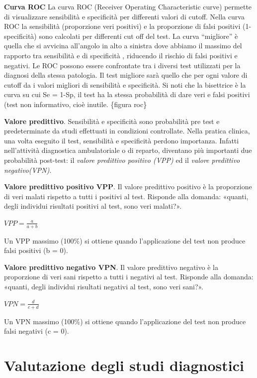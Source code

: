 \documentclass[]{book}
\begin{document}
\textbf{Curva ROC}
La curva ROC (Receiver Operating Characteristic curve) permette di visualizzare sensibilità e specificità per differenti valori di cutoff. Nella curva ROC la sensibilità (proporzione veri positivi) e la proporzione di falsi positivi (1- specificità) sono calcolati per differenti cut off del test. La curva ``migliore'' è quella che si avvicina all'angolo in alto a sinistra dove abbiamo il massimo del rapporto tra sensibilità e di specificità , riducendo il rischio di falsi positivi e negativi.
Le ROC possono essere confrontate tra i diversi test utilizzati per la diagnosi della stessa patologia. Il test migliore sarà quello che per ogni valore di cutoff da i valori migliori di sensibilità e specificità. Si noti che la bisettrice è la curva su cui Se = 1-Sp, il test ha la stessa probabilità di dare veri e falsi positivi (test non informativo, cioè inutile.
\{figura roc\}

\textbf{Valore predittivo}.
Sensibilità e specificità sono probabilità pre test e predeterminate da studi effettuati in condizioni controllate. Nella pratica clinica, una volta eseguito il test, sensibilità e specificità perdono importanza. Infatti nell'attività diagnostica ambulatoriale o di reparto, diventano più importanti due probabilità post-test: il \emph{valore predittivo positivo (VPP)} ed il \emph{valore predittivo negativo(VPN)}.

\textbf{Valore predittivo positivo VPP}. Il valore predittivo positivo è la proporzione di veri malati rispetto a tutti i positivi al test. Risponde alla domanda: «quanti, degli individui risultati positivi al test, sono veri malati?».

\(VPP = \frac{a}{a+b}\)

Un VPP massimo (100\%) si ottiene quando l'applicazione del test non produce falsi positivi (b = 0).

\textbf{Valore predittivo negativo VPN}. Il valore predittivo negativo è la proporzione di veri sani rispetto a tutti i negativi al test. Risponde alla domanda: «quanti, degli individui risultati negativi al test, sono veri sani?».

\(VPN = \frac{d}{c+d}\)

Un VPN massimo (100\%) si ottiene quando l'applicazione del test non produce falsi negativi (c = 0).

\hypertarget{valutazione-degli-studi-diagnostici}{%
\section{Valutazione degli studi diagnostici}\label{valutazione-degli-studi-diagnostici}}
\end{document}
